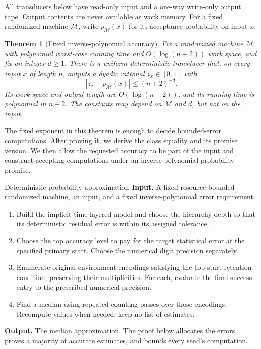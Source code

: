 \documentclass[11pt]{article}
\numberwithin{equation}{section}
\newtheorem{theorem}{Theorem}[section]
\theoremstyle{definition}
\theoremstyle{remark}
\begin{document}
All transducers below have read-only input and a one-way write-only
output tape. Output contents are never available as work memory.
For a fixed randomized machine $\mathcal M$, write
$p_{\mathcal M}(x)$ for its acceptance probability on input $x$.

\begin{theorem}[Fixed inverse-polynomial accuracy]
\label{thm:fixed-precision}
Fix a randomized machine $\mathcal M$ with polynomial worst-case
running time and $O(\log(n+2))$ work space, and fix an integer $d\ge1$.
There is a uniform deterministic transducer that, on every input $x$
of length $n$, outputs a dyadic rational $z_x\in[0,1]$ with
\[
 |z_x-p_{\mathcal M}(x)|\le(n+2)^{-d}.
\]
Its work space and output length are $O(\log(n+2))$, and its running
time is polynomial in $n+2$. The constants may depend on
$\mathcal M$ and $d$, but not on the input.
\end{theorem}

The fixed exponent in this theorem is enough to decide bounded-error
computations. After proving it, we derive the class equality and its
promise version. We then allow the requested accuracy to be part of the
input and construct accepting computations under an inverse-polynomial
probability promise.

\begin{algorithm}[label=alg:final-median]{Deterministic probability approximation}
\textbf{Input.} A fixed resource-bounded randomized machine, an input, and a fixed inverse-polynomial error requirement.
\begin{enumerate}[leftmargin=*]
\item Build the implicit time-layered model and choose the hierarchy depth so that its deterministic residual error is within its assigned tolerance.
\item Choose the top accuracy level to pay for the target statistical error at the specified primary start. Choose the numerical digit precision separately.
\item Enumerate original environment encodings satisfying the top start-retention condition, preserving their multiplicities. For each, evaluate the final success entry to the prescribed numerical precision.
\item Find a median using repeated counting passes over those encodings. Recompute values when needed; keep no list of estimates.
\end{enumerate}
\textbf{Output.} The median approximation. The proof below allocates the errors, proves a majority of accurate estimates, and bounds every seed's computation.
\end{algorithm}
\end{document}
